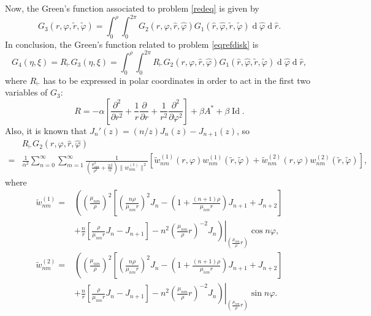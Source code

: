 \documentclass[a4paper,12pt,onecolumn]{article}
\theoremstyle{ptheorem}
\theoremstyle{hdef}
\theoremstyle{premark}
\numberwithin{equation}{section}
\numberwithin{figure}{section}
\DeclareMathOperator{\Id}{Id}
\DeclareMathOperator{\dif}{d}
\renewcommand{\a}{\alpha}
\renewcommand{\b}{\beta}
\newcommand{\<}{\langle}
\renewcommand{\>}{\rangle}
\renewcommand{\<}{\left<}
\renewcommand{\>}{\right>}
\renewcommand{\(}{\left(}
\renewcommand{\)}{\right)}
\newcommand{\til}{\tilde}
\begin{document}
Now, the Green's function associated to problem \eqref{redeq} is given by
\begin{displaymath}
G_3(r,\varphi,\tilde r,\tilde \varphi)=\int_{0}^{\rho}\int_{0}^{2\pi}G_2(r,\varphi,\hat r,\hat \varphi)G_1(\hat r,\hat\varphi,\tilde r,\tilde \varphi) \dif\hat\varphi  \dif \hat r. 
\end{displaymath}
In conclusion, the Green's function related to problem \eqref{eqrefdisk} is 
\[G_4(\eta,\xi)=R_\vdash G_3(\eta,\xi)=\int_{0}^{\rho}\int_{0}^{2\pi}R_\vdash G_2(r,\varphi,\hat r,\hat \varphi)G_1(\hat r,\hat\varphi,\tilde r,\tilde \varphi) \dif\hat\varphi  \dif \hat r,\]
where $R_\vdash$ has to be expressed in polar coordinates in order to act in the first two variables of $G_3$:
\[R=-\a\left[\frac{\partial^2}{\partial r^2}+\frac{1}{r}\frac{\partial}{\partial r}+\frac{1}{r^2}\frac{\partial^2}{\partial \varphi^2}\right]+\b A^*+\b\Id.\]
Also, it is known that $J_n'(z)=(n/z)J_n(z)-J_{n+1}(z)$, so
\begin{align*} &  R_\vdash G_2(r,\varphi,\hat r,\hat \varphi) \\ = & \frac{1}{\alpha^2}\sum_{n=0}^{\infty}\sum_{m=1}^{\infty}\frac{1}{\left(\frac{\mu_{nm}^2}{\rho^2}+\frac{2\beta}{\alpha}\right)\|w_{nm}^{(1)}\|^2}
\left[\til w_{nm}^{(1)}(r,\varphi)w_{nm}^{(1)}(\tilde r,\tilde \varphi)+\til w_{nm}^{(2)}(r,\varphi)w_{nm}^{(2)}(\tilde r,\tilde \varphi) \right],\end{align*}
where
\begin{align*}
\til w_{nm}^{(1)}  = & \left.\left(\left(\frac{\mu_{nm}}{\rho}\right)^2\left[\(\frac{n\rho}{\mu_{nm}r}\right)^2J_n-\left(1+\frac{(n+1)\rho}{\mu_{nm}r}\right)J_{n+1}+J_{n+2}\right]\right.\right.\\ & \left.\left.+\frac{n}{r}\left[\frac{\rho}{\mu_{nm}r} J_n-J_{n+1}\right] -n^2\left(\frac{\mu_{nm}}{\rho}r\right)^{-2}J_n\right)\right|_{\left(\frac{\mu_{nm}}{\rho}r\right)} \cos n\varphi, \\ \til w_{nm}^{(2)}  = & \left.\left(\left(\frac{\mu_{nm}}{\rho}\right)^2\left[\(\frac{n\rho}{\mu_{nm}r}\right)^2J_n-\left(1+\frac{(n+1)\rho}{\mu_{nm}r}\right)J_{n+1}+J_{n+2}\right]\right.\right.\\ & \left.\left.+\frac{n}{r}\left[\frac{\rho}{\mu_{nm}r} J_n-J_{n+1}\right] -n^2\left(\frac{\mu_{nm}}{\rho}r\right)^{-2}J_n\right)\right|_{\left(\frac{\mu_{nm}}{\rho}r\right)} \sin n\varphi.
\end{align*}
\end{document}
